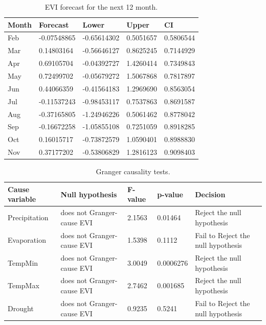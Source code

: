\begin{table}[]
	\label{table:Prediction}
	\caption{EVI forecast for the next 12 month.}
	\centering
	\addtolength{\tabcolsep}{20pt}
	\begin{tabularx}{\textwidth}{@{}lllll@{}}
		\toprule
   Month       & Forecast& Lower  &   Upper  &CI\\
   \bottomrule
Feb &-0.07548865& -0.65614302& 0.5051657& 0.5806544\\
Mar & 0.14803164& -0.56646127& 0.8625245& 0.7144929\\
Apr & 0.69105704& -0.04392727& 1.4260414& 0.7349843\\
May & 0.72499702& -0.05679272& 1.5067868& 0.7817897\\
Jun & 0.44066359& -0.41564183& 1.2969690& 0.8563054\\
Jul &-0.11537243& -0.98453117& 0.7537863& 0.8691587\\
Aug &-0.37165805& -1.24946226& 0.5061462& 0.8778042\\
Sep &-0.16672258& -1.05855108& 0.7251059& 0.8918285\\
Oct & 0.16015717& -0.73872579& 1.0590401& 0.8988830\\
Nov &  0.37177202& -0.53806829& 1.2816123& 0.9098403\\
		 \bottomrule
\end{tabularx}
\end{table}
\begin{table}[]
	\label{Optimal lag}
	\caption{Granger causality tests.}
	\centering
	\small
	\addtolength{\tabcolsep}{-3pt}
	\begin{tabularx}{\textwidth}{@{}lllll@{}}
	\hline
	Cause variable &Null hypothesis& F-value& p-value& Decision\\
	\hline\hline
Precipitation	& does not Granger-cause EVI &2.1563  & 0.01464  & Reject the null hypothesis  \\
	\hline
Evaporation	& does not Granger-cause EVI & 1.5398 & 0.1112 &Fail to Reject the null hypothesis  \\
	\hline
TempMin	&  does not Granger-cause EVI&3.0049  & 0.0006276 &Reject the null hypothesis  \\
	\hline
TempMax	& does not Granger-cause EVI &2.7462  & 0.001685 &Reject the null hypothesis  \\
	\hline
Drought	& does not Granger-cause EVI & 0.9235 & 0.5241 &Fail to Reject the null hypothesis \\
	\hline
\end{tabularx}
\end{table}
